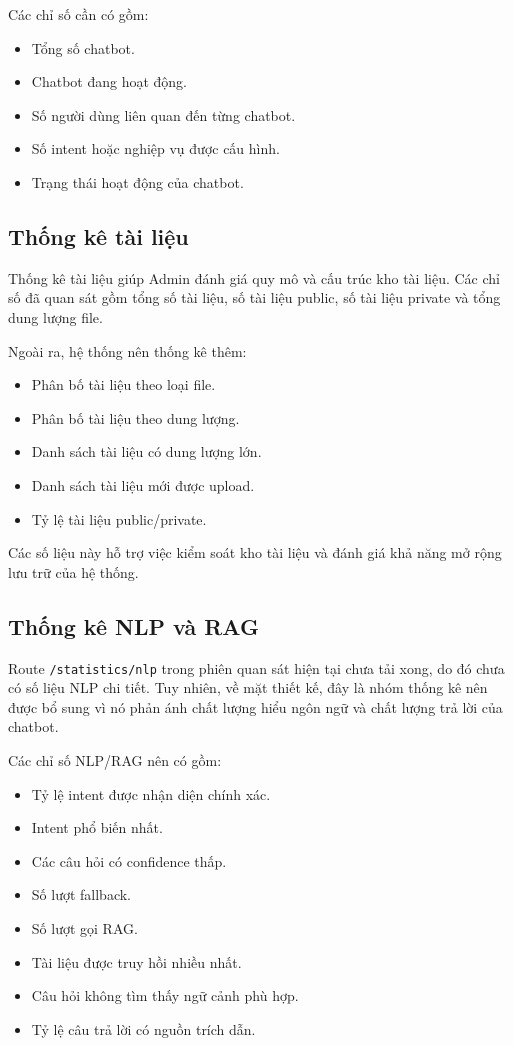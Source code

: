 \documentclass[12pt,a4paper]{report}
\begin{document}
Các chỉ số cần có gồm:

\begin{itemize}
    \item Tổng số chatbot.
    \item Chatbot đang hoạt động.
    \item Số người dùng liên quan đến từng chatbot.
    \item Số intent hoặc nghiệp vụ được cấu hình.
    \item Trạng thái hoạt động của chatbot.
\end{itemize}

\subsection{Thống kê tài liệu}

Thống kê tài liệu giúp Admin đánh giá quy mô và cấu trúc kho tài liệu. Các chỉ số đã quan sát gồm tổng số tài liệu, số tài liệu public, số tài liệu private và tổng dung lượng file.

Ngoài ra, hệ thống nên thống kê thêm:

\begin{itemize}
    \item Phân bố tài liệu theo loại file.
    \item Phân bố tài liệu theo dung lượng.
    \item Danh sách tài liệu có dung lượng lớn.
    \item Danh sách tài liệu mới được upload.
    \item Tỷ lệ tài liệu public/private.
\end{itemize}

Các số liệu này hỗ trợ việc kiểm soát kho tài liệu và đánh giá khả năng mở rộng lưu trữ của hệ thống.

\subsection{Thống kê NLP và RAG}

Route \texttt{/statistics/nlp} trong phiên quan sát hiện tại chưa tải xong, do đó chưa có số liệu NLP chi tiết. Tuy nhiên, về mặt thiết kế, đây là nhóm thống kê nên được bổ sung vì nó phản ánh chất lượng hiểu ngôn ngữ và chất lượng trả lời của chatbot.

Các chỉ số NLP/RAG nên có gồm:

\begin{itemize}
    \item Tỷ lệ intent được nhận diện chính xác.
    \item Intent phổ biến nhất.
    \item Các câu hỏi có confidence thấp.
    \item Số lượt fallback.
    \item Số lượt gọi RAG.
    \item Tài liệu được truy hồi nhiều nhất.
    \item Câu hỏi không tìm thấy ngữ cảnh phù hợp.
    \item Tỷ lệ câu trả lời có nguồn trích dẫn.
\end{itemize}
\end{document}
